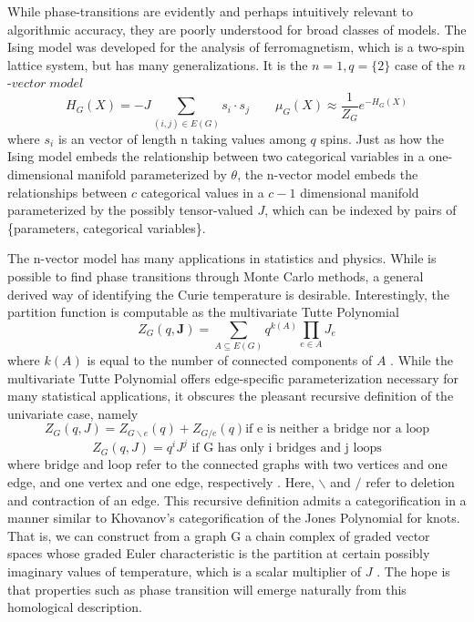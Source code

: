 \documentclass[12pt]{article}
\begin{document}
While phase-transitions are evidently and perhaps intuitively relevant to algorithmic accuracy, they are poorly understood for broad classes of models.  The Ising model was developed for the analysis of ferromagnetism, which is a two-spin lattice system, but has many generalizations.  It is the $n=1, q = \{2\}$ case of the $n$-$vector\;model$
\[H_G(X) = -J\sum_{(i,j) \in E(G)}s_i \cdot s_j  \qquad \mu_{G}(X) \approx \frac{1}{Z_{G}}e^{-H_G(X)}\]
where $s_i$ is an vector of length n taking values among $q$ spins.  Just as how the Ising model embeds the relationship between two categorical variables in a one-dimensional manifold parameterized by $\theta$, the n-vector model embeds the relationships between $c$ categorical values in a $c-1$ dimensional manifold parameterized by the possibly tensor-valued $J$, which can be indexed by pairs of \{parameters, categorical variables\}.

The n-vector model has many applications in statistics and physics.  While is possible to find phase transitions through Monte Carlo methods, a general derived way of identifying the Curie temperature is desirable.  Interestingly, the partition function is computable as the multivariate Tutte Polynomial
\[Z_{G}(q,\textbf{J}) = \sum_{A \subseteq E(G)}q^{k(A)} \prod_{e \in A} J_e\]
where $k(A)$ is equal to the number of connected components of $A$ \citep{Sokal2005-ql}.  While the multivariate Tutte Polynomial offers edge-specific parameterization necessary for many statistical applications, it obscures the pleasant recursive definition of the univariate case, namely
\[Z_{G}(q,J) = Z_{G\backslash{e}}(q) + Z_{G/e}(q) \text{if e is neither a bridge nor a loop}\]
\[Z_{G}(q,J) = q^iJ^j \text{ if G has only i bridges and j loops}\]
where bridge and loop refer to the connected graphs with two vertices and one edge, and one vertex and one edge, respectively \citep{Beaudin2007-vh}.  Here, $\backslash$ and $/$ refer to deletion and contraction of an edge.  This recursive definition admits a categorification in a manner similar to Khovanov's categorification of the Jones Polynomial for knots.  That is, we can construct from a graph G a chain complex of graded vector spaces whose graded Euler characteristic is the partition at certain possibly imaginary values of temperature, which is a scalar multiplier of $J$ \citep{Kauffman2009-ag}.  The hope is that properties such as phase transition will emerge naturally from this homological description.
\end{document}
